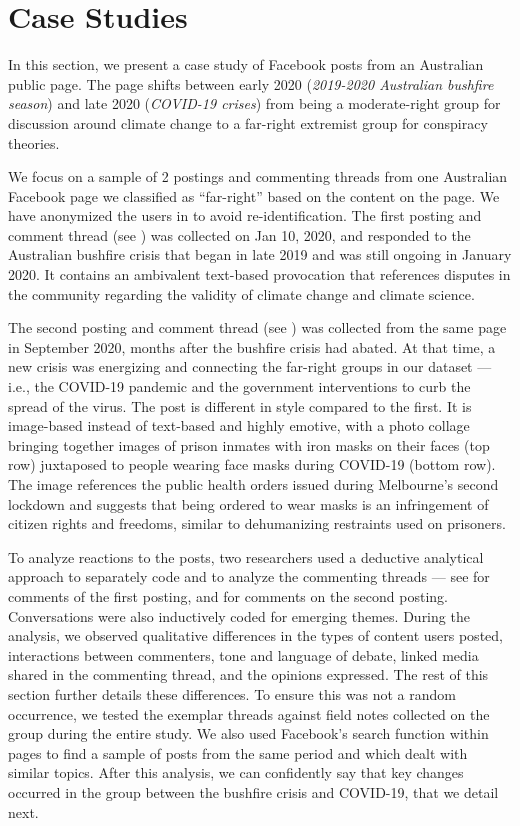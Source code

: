 
\section{Case Studies}
\label{sec:case_studies}
In this section, we present a case study of Facebook posts from an Australian public page.
The page shifts between early 2020 (\emph{2019-2020 Australian bushfire season}) and late 2020 (\emph{COVID-19 crises}) from being a moderate-right group for discussion around climate change to a far-right extremist group for conspiracy theories.


We focus on a sample of 2 postings and commenting threads from one Australian Facebook page we classified as ``far-right'' based on the content on the page. 
We have anonymized the users in  to avoid re-identification.
The first posting and comment thread (see ) was collected on Jan 10, 2020, and responded to the Australian bushfire crisis that began in late 2019 and was still ongoing in January 2020. It contains an ambivalent text-based provocation that references disputes in the community regarding the validity of climate change and climate science. 

The second posting and comment thread (see ) was collected from the same page in September 2020, months after the bushfire crisis had abated.
At that time, a new crisis was energizing and connecting the far-right groups in our dataset --- i.e., the COVID-19 pandemic and the government interventions to curb the spread of the virus. 
The post is different in style compared to the first.
It is image-based instead of text-based and highly emotive, with a photo collage bringing together images of prison inmates with iron masks on their faces (top row) juxtaposed to people wearing face masks during COVID-19 (bottom row). 
The image references the public health orders issued during Melbourne's second lockdown and suggests that being ordered to wear masks is an infringement of citizen rights and freedoms, similar to dehumanizing restraints used on prisoners.

To analyze reactions to the posts, two researchers used a deductive analytical approach to separately code and to analyze the commenting threads --- see  for comments of the first posting, and  for comments on the second posting. 
Conversations were also inductively coded for emerging themes. 
During the analysis, we observed qualitative differences in the types of content users posted, interactions between commenters, tone and language of debate, linked media shared in the commenting thread, and the opinions expressed.
The rest of this section further details these differences.
To ensure this was not a random occurrence, we tested the exemplar threads against field notes collected on the group during the entire study.
We also used Facebook's search function within pages to find a sample of posts from the same period and which dealt with similar topics. 
After this analysis, we can confidently say that key changes occurred in the group between the bushfire crisis and COVID-19, that we detail next.

